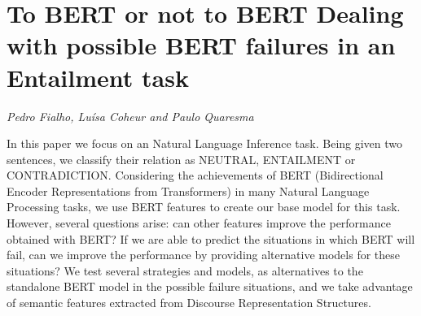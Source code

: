 \documentclass[../booklet.tex]{subfiles}
\begin{document}
\section[To BERT or not to BERT Dealing with possible BERT failures in an Entailment task. {\it Pedro Fialho, Luísa Coheur and Paulo Quaresma}]{To BERT or not to BERT Dealing with possible BERT failures in an Entailment task}
  

\begin{center}
  {\it Pedro Fialho, Luísa Coheur and Paulo Quaresma}
\end{center}

\vskip 0.8cm


In this paper we focus on an Natural Language Inference task. Being given two sentences, we classify their relation as NEUTRAL, ENTAILMENT or CONTRADICTION. Considering the achievements of BERT (Bidirectional Encoder Representations from Transformers) in many Natural Language Processing tasks, we use BERT features to create our base model for this task. However, several questions arise: can other features improve the performance obtained with BERT? If we are able to predict the situations in which BERT will fail, can we improve the performance by providing alternative models for these situations? We test several strategies and models, as alternatives to the standalone BERT model in the possible failure situations, and we take advantage of semantic features extracted from Discourse Representation Structures.

\end{document}
